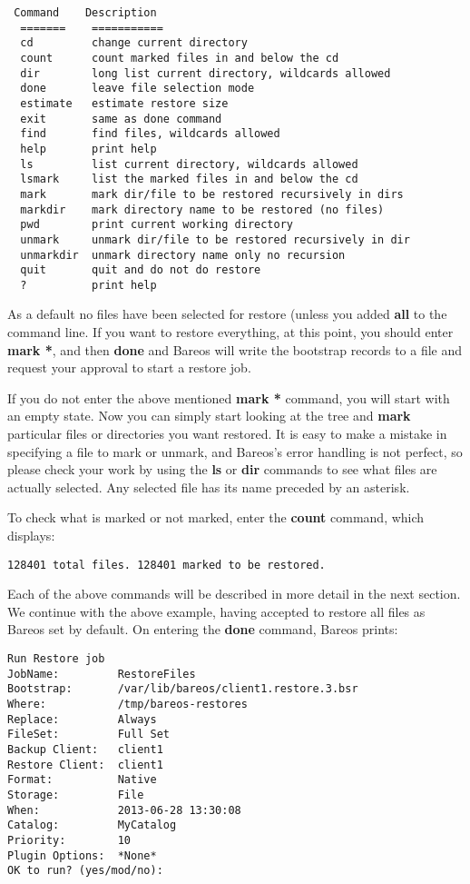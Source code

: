 \footnotesize
\begin{verbatim}
 Command    Description
  =======    ===========
  cd         change current directory
  count      count marked files in and below the cd
  dir        long list current directory, wildcards allowed
  done       leave file selection mode
  estimate   estimate restore size
  exit       same as done command
  find       find files, wildcards allowed
  help       print help
  ls         list current directory, wildcards allowed
  lsmark     list the marked files in and below the cd
  mark       mark dir/file to be restored recursively in dirs
  markdir    mark directory name to be restored (no files)
  pwd        print current working directory
  unmark     unmark dir/file to be restored recursively in dir
  unmarkdir  unmark directory name only no recursion
  quit       quit and do not do restore
  ?          print help
\end{verbatim}
\normalsize

As a default no files have been selected for restore (unless you
added {\bf all} to the command line. If you want to restore
everything, at this point, you should enter {\bf mark *}, and then {\bf done}
and Bareos will write the bootstrap records to a file and request your
approval to start a restore job.

If you do not enter the above mentioned {\bf mark *} command, you will start
with an empty state. Now you can simply start looking at the tree and {\bf
mark} particular files or directories you want restored. It is easy to make
a mistake in specifying a file to mark or unmark, and Bareos's error handling
is not perfect, so please check your work by using the {\bf ls} or {\bf dir}
commands to see what files are actually selected. Any selected file has its
name preceded by an asterisk.

To check what is marked or not marked, enter the {\bf count} command, which
displays:

\footnotesize
\begin{verbatim}
128401 total files. 128401 marked to be restored.

\end{verbatim}
\normalsize

Each of the above commands will be described in more detail in the next
section. We continue with the above example, having accepted to restore all
files as Bareos set by default. On entering the {\bf done} command, Bareos
prints:

\footnotesize
\begin{verbatim}
Run Restore job
JobName:         RestoreFiles
Bootstrap:       /var/lib/bareos/client1.restore.3.bsr
Where:           /tmp/bareos-restores
Replace:         Always
FileSet:         Full Set
Backup Client:   client1
Restore Client:  client1
Format:          Native
Storage:         File
When:            2013-06-28 13:30:08
Catalog:         MyCatalog
Priority:        10
Plugin Options:  *None*
OK to run? (yes/mod/no):
\end{verbatim}
\normalsize

